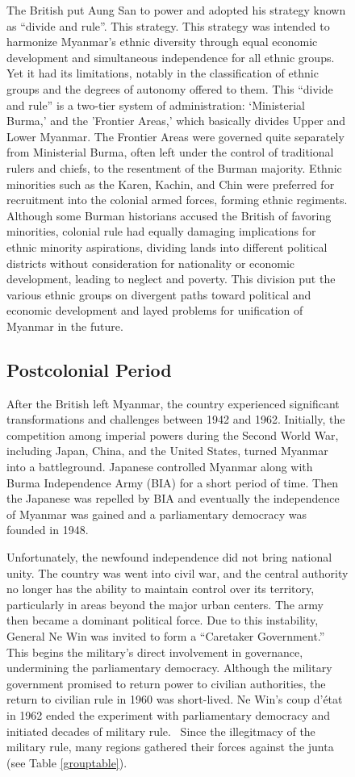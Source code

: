 \documentclass{article}
\begin{document}
\begin{figure}[H]
{{The British put Aung San to power and adopted his strategy known as ``divide and rule''. This strategy. This strategy was intended to harmonize Myanmar's ethnic diversity through equal economic development and simultaneous independence for all ethnic groups. Yet it had its limitations, notably in the classification of ethnic groups and the degrees of autonomy offered to them. This ``divide and rule'' is a two-tier system of administration: `Ministerial Burma,' and the 'Frontier Areas,' which basically divides Upper and Lower Myanmar. The Frontier Areas were governed quite separately from Ministerial Burma, often left under the control of traditional rulers and chiefs, to the resentment of the Burman majority. Ethnic minorities such as the Karen, Kachin, and Chin were preferred for recruitment into the colonial armed forces, forming ethnic regiments. Although some Burman historians accused the British of favoring minorities, colonial rule had equally damaging implications for ethnic minority aspirations, dividing lands into different political districts without consideration for nationality or economic development, leading to neglect and poverty. This division put the various ethnic groups on divergent paths toward political and economic development and layed problems for unification of Myanmar in the future.\autocite[18-23]{smithEthnicGroupsBurma1994}


\subsection{Postcolonial Period}

After the British left Myanmar, the country experienced significant transformations and challenges between 1942 and 1962. Initially, the competition among imperial powers during the Second World War, including Japan, China, and the United States, turned Myanmar into a battleground. Japanese controlled Myanmar along with Burma Independence Army (BIA) for a short period of time. Then the Japanese was repelled by BIA and eventually the independence of Myanmar was gained and a parliamentary democracy was founded in 1948.~\autocite[225-238]{aung-thwinHistoryMyanmarAncient2012}

Unfortunately, the newfound independence did not bring national unity. The country was went into civil war, and the central authority no longer has the ability to maintain control over its territory, particularly in areas beyond the major urban centers. The army then became a dominant political force. Due to this instability, General Ne Win was invited to form a ``Caretaker Government.'' This begins the military's direct involvement in governance, undermining the parliamentary democracy. Although the military government promised to return power to civilian authorities, the return to civilian rule in 1960 was short-lived. Ne Win's coup d'état in 1962 ended the experiment with parliamentary democracy and initiated decades of military rule.~\autocite[238-244]{aung-thwinHistoryMyanmarAncient2012} Since the illegitmacy of the military rule, many regions gathered their forces against the junta (see Table \ref{grouptable}).

}}
\end{figure}
\end{document}
